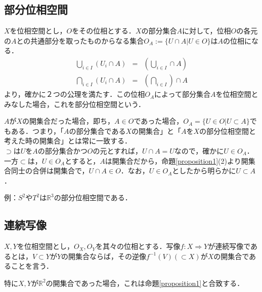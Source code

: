 \documentclass[uplatex, 12pt, a4paper, dvipdfmx]{jsarticle}
\begin{document}
\subsection{部分位相空間}
$X$を位相空間とし，$O$をその位相とする．$X$の部分集合$A$に対して，位相$O$の各元の$A$との共通部分を取ったものからなる集合$O_A:=\{ U\cap A | U\in O \}$は$A$の位相になる．
\begin{eqnarray*}
    \bigcup_{i\in I}(U_i\cap A) &=& (\bigcup_{i\in I} \cap A) \\
    \bigcap_{i\in I}(U_i\cap A) &=& (\bigcap_{i\in I}) \cap A 
\end{eqnarray*}
より，確かに２つの公理を満たす．この位相$O_A$によって部分集合$A$を位相空間とみなした場合，これを部分位相空間という．\par

$A$が$X$の開集合だった場合，即ち，$A\in O$であった場合，$O_A=\{U\in O | U\subset A \}$でもある．つまり，「$A$の部分集合である$X$の開集合」と「$A$を$X$の部分位相空間と考えた時の開集合」とは常に一致する．\\
$\supset$は$U$を$A$の部分集合かつ$O$の元とすれば，$U\cap A=U$なので，確かに$U\in O_A$．一方$\subset$は，$U\in O_A$とすると，$A$は開集合だから，命題\ref{proposition1}(2)より開集合同士の合併は開集合で，$U\cap A \in O$．なお，$U\in O_A$としたから明らかに$U\subset A$．

例：$S^2やT^2$は$\mathbb{R}^3$の部分位相空間である．\\

\subsection{連続写像}

\begin{shadebox}\begin{definition}[連続写像]
    $X,Y$を位相空間とし，$O_X,O_Y$を其々の位相とする．写像$f:X\Longrightarrow Y$が連続写像であるとは，$V\subset Y$が$Y$の開集合ならば，その逆像$f^{-1}(V)(\subset X)$が$X$の開集合であることを言う．
\end{definition}\end{shadebox}
特に$X,Y$が$\mathbb{R}^2$の開集合であった場合，これは命題\ref{proposition1}と合致する．
\end{document}
